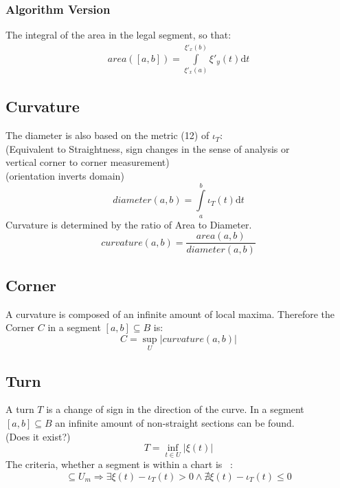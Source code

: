 \documentclass{report}
\newcommand\norm[1]{\left\lVert#1\right\rVert}
\begin{document}
\subsubsection{Algorithm Version}
The integral of the area in the legal segment, so that:
\begin{align}
area([a,b])= \int \limits _{\xi'_{x}(a)}^{\xi'_{x}(b)} \xi'_{y}(t)\mathrm{d}t
\end{align}
\fi

\subsection{Curvature}
\iffalse
Because the diameter has to be calculated piece-wise, we have to set up a vector space with the turns $P_{n},P_{n+1} \in T$.
\begin{equation}
v \in (B,\norm{\cdot})
\end{equation}
Note: It is a Banach space.\\
\fi
The diameter is also based on the metric (12) of $\iota_{T}$:\\
(Equivalent to Straightness, sign changes in the sense of analysis or\\
vertical corner to corner measurement)\\
(orientation inverts domain)
\begin{equation}
diameter(a,b)=\int \limits _{a}^{b} \iota_{T}(t) \mathrm{d}t
\end{equation}
Curvature is determined by the ratio of Area to Diameter.
\begin{equation}
curvature(a,b) = \frac{area(a,b)}{diameter(a,b)}
\end{equation}

\subsection{Corner}
A curvature is composed of an infinite amount of local maxima. Therefore the Corner $C$ in a segment $[a,b] \subseteq B$ is:
\begin{equation}
C = \sup_{U}\lvert curvature(a,b) \rvert
\end{equation}

\subsection{Turn}
A turn $T$ is a change of sign in the direction of the curve. In a segment $[a,b] \subseteq B$ an infinite amount of non-straight sections can be found.\\
(Does it exist?)
\begin{equation}
T = \inf_{t \in U} \lvert \xi(t) \rvert
\end{equation}
The criteria, whether a segment is within a chart is ~\cite[]{Loring}:
\begin{equation}
[a,b] \subseteq U_{m} \Rightarrow \exists  \xi(t) - \iota_{T}(t) >0 \land \nexists \xi(t) - \iota_{T}(t) \leq0
\end{equation}
\end{document}
